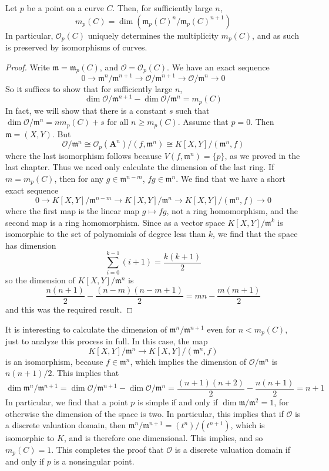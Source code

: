 \begin{prop}
    Let $p$ be a point on a curve $C$. Then, for sufficiently large $n$,
    \[ m_p(C) = \dim(\mathfrak{m}_p(C)^n/\mathfrak{m}_p(C)^{n+1}) \]
    In particular, $\mathcal{O}_p(C)$ uniquely determines the multiplicity $m_p(C)$, and as such is preserved by isomorphisms of curves.
\end{prop}
\begin{proof}
    Write $\mathfrak{m} = \mathfrak{m}_p(C)$, and $\mathcal{O} = \mathcal{O}_p(C)$. We have an exact sequence
    \[ 0 \to \mathfrak{m}^n/\mathfrak{m}^{n+1} \to \mathcal{O}/\mathfrak{m}^{n+1} \to \mathcal{O}/\mathfrak{m}^n \to 0 \]
    So it suffices to show that for sufficiently large $n$,
    \[ \dim \mathcal{O}/\mathfrak{m}^{n+1} - \dim \mathcal{O}/\mathfrak{m}^n = m_p(C) \]
    In fact, we will show that there is a constant $s$ such that $\dim \mathcal{O}/\mathfrak{m}^n = nm_p(C) + s$ for all $n \geq m_p(C)$. Assume that $p = 0$. Then $\mathfrak{m} = (X,Y)$. But
    \[ \mathcal{O}/\mathfrak{m}^n \cong \mathcal{O}_p(\mathbf{A}^n)/(f,\mathfrak{m}^n) \cong K[X,Y]/(\mathfrak{m}^n,f) \]
    where the last isomorphism follows because $V(f,\mathfrak{m}^n) = \{ p \}$, as we proved in the last chapter. Thus we need only calculate the dimension of the last ring. If $m = m_p(C)$, then for any $g \in \mathfrak{m}^{n-m}$, $fg \in \mathfrak{m}^n$. We find that we have a short exact sequence
    \[ 0 \to K[X,Y]/\mathfrak{m}^{n-m} \to K[X,Y]/\mathfrak{m}^n \to K[X,Y]/(\mathfrak{m}^n,f) \to 0 \]
    where the first map is the linear map $g \mapsto fg$, not a ring homomorphism, and the second map is a ring homomorphism. Since as a vector space $K[X,Y]/\mathfrak{m}^k$ is isomorphic to the set of polynomials of degree less than $k$, we find that the space has dimension
    \[ \sum_{i = 0}^{k-1} (i+1) = \frac{k(k+1)}{2} \]
    so the dimension of $K[X,Y]/\mathfrak{m}^n$ is
    \[ \frac{n(n+1)}{2} - \frac{(n-m)(n-m+1)}{2} = mn - \frac{m(m+1)}{2} \]
    and this was the required result.
\end{proof}

It is interesting to calculate the dimension of $\mathfrak{m}^n/\mathfrak{m}^{n+1}$ even for $n < m_p(C)$, just to analyze this process in full. In this case, the map
%
\[ K[X,Y]/\mathfrak{m}^n \to K[X,Y]/(\mathfrak{m}^n,f) \]
%
is an isomorphism, because $f \in \mathfrak{m}^n$, which implies the dimension of $\mathcal{O}/\mathfrak{m}^n$ is $n(n+1)/2$. This implies that
%
\[ \dim \mathfrak{m}^n/\mathfrak{m}^{n+1} = \dim \mathcal{O}/\mathfrak{m}^{n+1} - \dim \mathcal{O}/\mathfrak{m}^n = \frac{(n+1)(n+2)}{2} - \frac{n(n+1)}{2} = n + 1 \]
%
In particular, we find that a point $p$ is simple if and only if $\dim \mathfrak{m}/\mathfrak{m}^2 = 1$, for otherwise the dimension of the space is two. In particular, this implies that if $\mathcal{O}$ is a discrete valuation domain, then $\mathfrak{m}^n/\mathfrak{m}^{n+1} = (t^n)/(t^{n+1})$, which is isomorphic to $K$, and is therefore one dimensional. This implies, and so $m_p(C) = 1$. This completes the proof that $\mathcal{O}$ is a discrete valuation domain if and only if $p$ is a nonsingular point.

